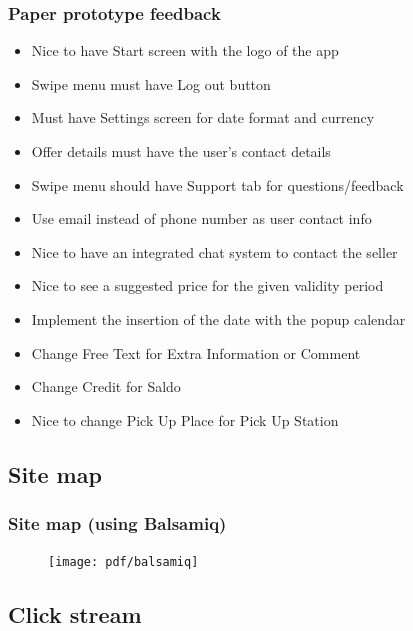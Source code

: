\documentclass{beamer}
\begin{document}
\begin{frame}
\frametitle{Paper prototype feedback}
\begin{itemize}
\item Nice to have Start screen with the logo of the app
\item Swipe menu must have Log out button
\item Must have Settings screen for date format and currency
\item Offer details must have the user's contact details
\item Swipe menu should have Support tab for questions/feedback
\item Use email instead of phone number as user contact info
\item Nice to have an integrated chat system to contact the seller
\item Nice to see a suggested price for the given validity period
\item Implement the insertion of the date with the popup calendar
\item Change Free Text for Extra Information or Comment
\item Change Credit for Saldo
\item Nice to change Pick Up Place for Pick Up Station
\end{itemize}
\end{frame}


\subsection{Site map} %


\begin{frame}
\frametitle{Site map (using Balsamiq)}
\begin{figure}
\texttt{[image: pdf/balsamiq]}
\end{figure}
\end{frame}


\subsection{Click stream} %
\end{document}

